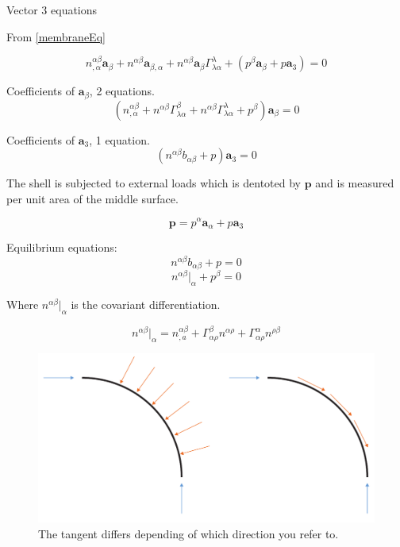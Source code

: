 Vector 3 equations

From \ref{membraneEq}

\begin{equation}
n^{\alpha \beta}_{,\alpha} \textbf{a}_\beta + n^{\alpha \beta}\textbf{a}_{\beta,\alpha} + n^{\alpha \beta}\textbf{a}_\beta \Gamma^\lambda_{\lambda \alpha} + (p^\beta \textbf{a}_\beta + p\textbf{a}_3) = 0
\end{equation}

Coefficients of $\textbf{a}_\beta$,  2 equations.
\begin{equation}
(n^{\alpha \beta}_{,\alpha} + n^{\alpha \beta}\Gamma^\beta_{\lambda \alpha} + n^{\alpha \beta}\Gamma^\lambda_{\lambda \alpha} + p^\beta) \textbf{a}_\beta = 0 
\end{equation}

Coefficients of $\textbf{a}_3$,  1 equation.
\begin{equation}
(n^{\alpha \beta} b_{\alpha \beta} + p)\textbf{a}_3 = 0
\end{equation}

The shell is subjected to external loads which is dentoted by $\textbf{p}$ and is measured per unit area of the middle surface.

\begin{equation}
\textbf{p} = p^{\alpha}\textbf{a}_\alpha +p\textbf{a}_3
\end{equation}


Equilibrium equations:
\begin{equation}
n^{\alpha \beta}b_{\alpha \beta} + p = 0
\end{equation}
\begin{equation}
n^{\alpha \beta}|_\alpha + p^\beta = 0
\end{equation}

Where $n^{\alpha \beta}|_\alpha$ is the covariant differentiation. 

\begin{equation}
n^{\alpha \beta}|_\alpha = n^{\alpha \beta}_{,a} + \Gamma^\beta_{\alpha \rho} n^{\alpha \rho} + \Gamma^\alpha_{\alpha \rho} n^{\rho \beta}
\end{equation}


\begin{figure}[H]
\centering
\includegraphics[width=0.9\linewidth ]{figure/Theory/equlibriumMem.pdf}
\caption{The tangent differs depending of which direction you refer to. }
\end{figure}

